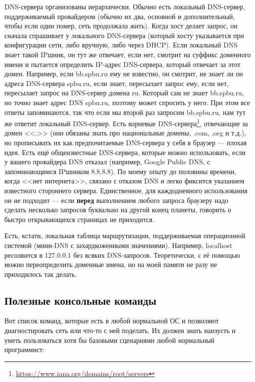 \documentclass{../../text-style}
\begin{document}
DNS-сервера организованы иерархически. Обычно есть локальный DNS-сервер, поддерживаемый провайдером (обычно их два, основной и дополнительный, чтобы если один помер, сеть продолжала жить). Когда хост делает запрос, он сначала спрашивает у локального DNS-сервера (который хосту указывается при конфигурации сети, либо вручную, либо через DHCP). Если локальный DNS знает такой IPшник, он тут же отвечает, если нет, смотрит на суффикс доменного имени и пытается определить IP-адрес DNS-сервера, который отвечает за этот домен. Например, если bb.spbu.ru ему не известно, он смотрит, не знает ли он адреса DNS-сервера spbu.ru, если знает, пересылает запрос ему, если нет, пересылает запрос на DNS-сервер домена ru. Который сам не знает bb.spbu.ru, но точно знает адрес DNS spbu.ru, поэтому может спросить у него. При этом все ответы запоминаются, так что если мы второй раз запросим bb.spbu.ru, нам тут же ответит локальный DNS-сервер. Есть корневые DNS-сервера\footnote{\url{https://www.iana.org/domains/root/servers}}, отвечающие за домен <<.>> (они обязаны знать про национальные домены, .com, .org и т.д.), но прописывать их как предпочитаемые DNS-сервера у себя в браузер --- плохая идея. Есть ещё общеизвестные DNS-сервера, которые можно использовать, если у вашего провайдера DNS отказал (например, Google Public DNS, с запоминающимся IPшником 8.8.8.8). По моему опыту до половины времени, когда <<нет интернета>>, связано с отказом DNS и легко фиксится указанием известного стороннего сервера. Единственное, для каждодневного использования он не подходит --- если \textbf{перед} выполнением любого запроса браузеру надо сделать несколько запросов буквально на другой конец планеты, говорить о быстро открывающихся страницах не приходится.

Есть, кстати, локальная таблица маршрутизации, поддерживаемая операционной системой (мини-DNS с захардкоженными значениями). Например, localhost ресолвится в 127.0.0.1 без всяких DNS-запросов. Теоретически, с её помощью можно переопределить доменные имена, но на моей памяти не разу не приходилось так делать.

\subsection{Полезные консольные команды}

Вот список команд, которые есть в любой нормальной ОС и позволяют диагностировать сеть или что-то с ней поделать. Их должен знать наизусть и уметь пользоваться хотя бы базовыми сценариями любой нормальный программист:
\end{document}
